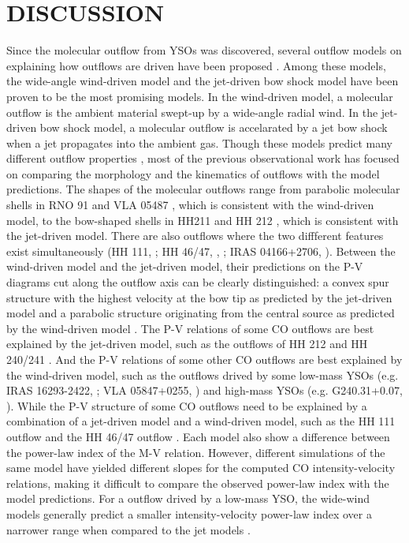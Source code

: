 \section{DISCUSSION}\label{discussion}
Since the molecular outflow from YSOs was discovered, several outflow models on explaining how outflows are driven have been proposed \citep{2007prpl.conf..245A}. Among these models, the wide-angle wind-driven model \citep{1991ApJ...370L..31S,1996ApJ...472..211L, 2001ApJ...557..429L} and the jet-driven bow shock model \citep{ 1993A&A...278..267R, 1993ApJ...414..230M, 2001ApJ...557..429L} have been proven to be the most promising models.
In the wind-driven model, a molecular outflow is the ambient material swept-up by a wide-angle radial wind. In the jet-driven bow shock model, a molecular outflow is accelarated by a jet bow shock when a jet propagates into the ambient gas. Though these models predict many different outflow properties \citep{2007prpl.conf..245A}, most of the previous observational work has focused on comparing the morphology and the kinematics of outflows with the model predictions. The shapes of the molecular outflows range from parabolic molecular shells in RNO 91 and VLA 05487 \citep{2000ApJ...542..925L}, which is consistent with the wind-driven model, to the bow-shaped shells in HH211 \citep{1999A&A...343..571G} and HH 212 \citep{2000ApJ...542..925L}, which is consistent with the jet-driven model. There are also outflows where the two diffferent features exist simultaneously (HH 111, \citet{2000ApJ...542..925L}; HH 46/47, \citet{2013ApJ...774...39A}, \citet{2016ApJ...832..158Z}; IRAS 04166+2706, \citet{2009A&A...495..169S}).
Between the wind-driven model and the jet-driven model, their predictions on the P-V diagrams cut along the outflow axis can be clearly distinguished: a convex spur structure with the highest velocity at the bow tip as predicted by the jet-driven model and a parabolic structure originating from the central source as predicted by the wind-driven model \citep{2001ApJ...557..429L}. The P-V relations of some CO outflows are best explained by the jet-driven model, such as the outflows of HH 212 and HH 240/241 \citep{2000ApJ...542..925L}. And the P-V relations of some other CO outflows are best explained by the wind-driven model, such as the outflows drived by some low-mass YSOs (e.g. IRAS 16293-2422, \citet{2008ApJ...675..454Y}; VLA 05847+0255, \citet{2000ApJ...542..925L}) and high-mass YSOs (e.g. G240.31+0.07, \citet{2009ApJ...696...66Q}). While the P-V structure of some CO outflows need to be explained by a combination of a jet-driven model and a wind-driven model, such as the HH 111 outflow \citep{2000ApJ...542..925L} and the HH 46/47 outflow \citep{2013ApJ...774...39A}. Each model also show a difference between the power-law index of the M-V relation. However, different simulations of the same model have yielded different slopes for the computed CO intensity-velocity relations, making it difficult to compare the observed power-law index with the model predictions. For a outflow drived by a low-mass YSO, the wide-wind models generally predict a smaller intensity-velocity power-law index over a narrower range when compared to the jet models \citep{2007prpl.conf..245A}.

